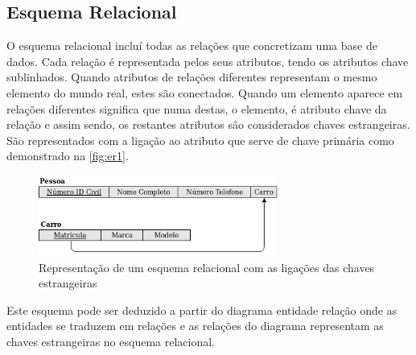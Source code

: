 \documentclass[11pt,twoside,a4paper]{report}
\begin{document}
\subsection{Esquema Relacional}
O esquema relacional incluí todas as relações que concretizam uma base de dados. Cada relação é representada pelos seus atributos, tendo os atributos chave sublinhados. Quando atributos de relações diferentes representam o mesmo elemento do mundo real, estes são conectados. Quando um elemento aparece em relações diferentes significa que numa destas, o elemento, é atributo chave da relação e assim sendo, os restantes atributos são considerados chaves estrangeiras. São representados com a ligação ao atributo que serve de chave primária como demonstrado na \autoref{fig:er1}\cite{Chen}.
\begin{figure}[H]
	\begin{center}
		\includegraphics[width=0.7\textwidth]{notacao15} %
		\caption{Representação de um esquema relacional com as ligações das chaves estrangeiras}
		\label{fig:er1}
	\end{center}
\end{figure}
Este esquema pode ser deduzido a partir do diagrama entidade relação onde as entidades se traduzem em relações e as relações do diagrama representam as chaves estrangeiras no esquema relacional.
\end{document}
